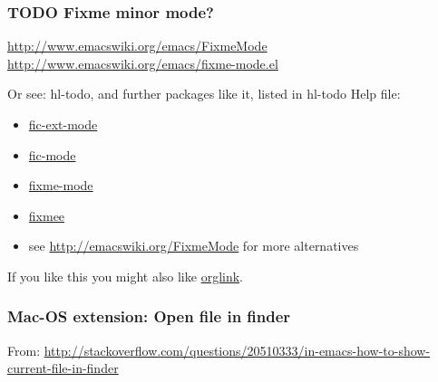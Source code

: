 \documentclass[nofonts]{tufte-handout}
\begin{document}
\subsubsection{{\bfseries\sffamily TODO} Fixme minor mode?}
\label{sec-1-11-19}

\url{http://www.emacswiki.org/emacs/FixmeMode}
\url{http://www.emacswiki.org/emacs/fixme-mode.el}

Or see: hl-todo, and further packages like it, listed in hl-todo Help file:

\begin{itemize}
\item \href{http://emacswiki.org/fic-ext-mode.el}{fic-ext-mode}
\item \href{https://github.com/lewang/fic-mode}{fic-mode}
\item \href{http://emacswiki.org/FixmeMode}{fixme-mode}
\item \href{https://github.com/rolandwalker/fixmee}{fixmee}
\item see \url{http://emacswiki.org/FixmeMode} for more alternatives
\end{itemize}

If you like this you might also like \href{https://github.com/tarsius/orglink}{orglink}.
\subsubsection{Mac-OS extension: Open file in finder}
\label{sec-1-11-20}

From: \url{http://stackoverflow.com/questions/20510333/in-emacs-how-to-show-current-file-in-finder}
\end{document}
